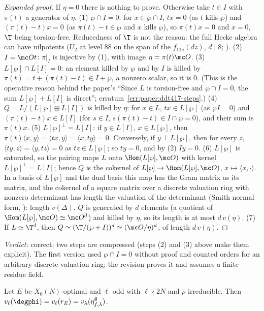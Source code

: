 \begin{sloppypar}
\begin{proof}[Expanded proof]
If $\eta=0$ there is nothing to prove. Otherwise take $t\in I$ with $\pi(t)$ a generator of $\eta$.
(1) $\wp\cap I=0$: for $x\in\wp\cap I$, $tx=0$ (as $t$ kills $\wp$) and $(\pi(t)-t)x=0$ (as $\pi(t)-t\in\wp$ and $x$ kills $\wp$), so $\pi(t)x=0$ and $x=0$, $\T$ being torsion-free. Reducedness of $\T$
is not the reason: the full Hecke algebra can have nilpotents ($U_2$ at level $88$ on the span of the $f_{11a}(dz)$, $d\mid8$; ).
(2) $I=\mc Ot$: $\pi|_I$ is injective by (1), with image $\eta=\pi(t)\mc O$.
(3) $L[\wp]\cap L[I]=0$: an element killed by $\wp$ and by $I$ is killed by $\pi(t)=t+(\pi(t)-t)\in I+\wp$, a nonzero scalar, so it is $0$. (This is the operative reason behind the paper's
``Since $L$ is torsion-free and $\wp\cap I=0$, the sum $L[\wp]+L[I]$ is direct''; erratum~\ref{err:paper:ddt417-steps}.)
(4) $Q=L/(L[\wp]\oplus L[I])$ is killed by $\eta$: for $x\in L$, $tx\in L[\wp]$ (as $\wp I=0$) and $(\pi(t)-t)x\in L[I]$ (for $s\in I$, $s(\pi(t)-t)\in I\cap\wp=0$), and their sum is $\pi(t)x$.
(5) $L[\wp]^\perp=L[I]$: if $y\in L[I]$, $x\in L[\wp]$, then $\pi(t)\langle x,y\rangle=\langle tx,y\rangle=\langle x,ty\rangle=0$. Conversely, if $y\perp L[\wp]$, then for every $z$, $\langle ty,z\rangle=\langle y,tz\rangle=0$ as
$tz\in L[\wp]$; so $ty=0$, and by (2) $Iy=0$.
(6) $L[\wp]$ is saturated, so the pairing maps $L$ onto $\Hom(L[\wp],\mc O)$ with kernel $L[\wp]^\perp=L[I]$; hence $Q$ is the cokernel of $L[\wp]\to\Hom(L[\wp],\mc O)$, $x\mapsto\langle x,\cdot\rangle$. In a basis of $L[\wp]$ and the dual basis this map has the Gram matrix as its matrix, and the
cokernel of a square matrix over a discrete valuation ring with nonzero determinant has length the valuation of the determinant (Smith normal form, ): length $v(\Delta)$. $Q$ is
generated by $d$ elements (a quotient of $\Hom(L[\wp],\mc O)\simeq\mc O^d$) and killed by $\eta$, so its length is at most $d\,v(\eta)$.
(7) If $L\simeq\T^d$, then $Q\simeq(\T/(\wp+I))^d\simeq(\mc O/\eta)^d$, of length $d\,v(\eta)$.
\end{proof}

\noindent\emph{Verdict:} correct; two steps are compressed (steps (2) and (3) above make them explicit). The first version used $\wp\cap I=0$ without proof and counted orders
for an arbitrary discrete valuation ring; the revision proves it and assumes a finite residue field.

\begin{lemma}\label{lem:paper:hecke}
Let $E$ be $X_0(N)$-optimal and $\ell$ odd with $\ell\nmid2N$ and $\bar\rho$ irreducible. Then $v_\ell(\degphi)=v_\ell(r_E)=v_\lambda(\eta^\emptyset_{f,\lambda})$.
\end{lemma}


\end{sloppypar}
